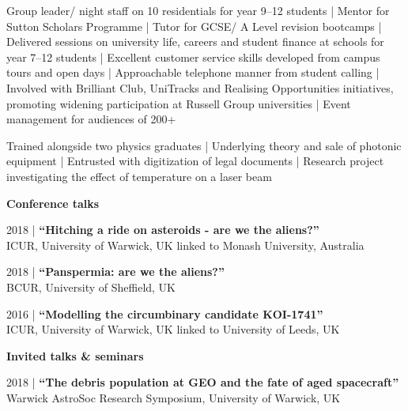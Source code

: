 \documentclass[10pt,a4paper]{altacv}
\begin{document}
\divider

\vspace{-1em}
\small \justify Group leader/ night staff on 10 residentials for year 9--12 students |
Mentor for Sutton Scholars Programme | 
Tutor for GCSE/ A Level revision bootcamps |
Delivered sessions on university life, careers and student finance at schools for year 7--12 students |
Excellent customer service skills developed from campus tours and open days |
Approachable telephone manner from student calling |
Involved with Brilliant Club, UniTracks and Realising Opportunities initiatives, promoting widening participation at Russell Group universities |
Event management for audiences of 200+

\divider

\vspace{-1em}
\small \justify Trained alongside two physics graduates | 
Underlying theory and sale of photonic equipment |
Entrusted with digitization of legal documents |
Research project investigating the effect of temperature on a laser beam

\clearpage


\normalsize \textbf{Conference talks}

\medskip

\small 2018 | \textbf{``Hitching a ride on asteroids - are we the aliens?''} \\
ICUR, University of Warwick, UK linked to Monash University, Australia

\smallskip

\small 2018 | \textbf{``Panspermia: are we the aliens?''} \\
BCUR, University of Sheffield, UK

\smallskip

\small 2016 | \textbf{``Modelling the circumbinary candidate KOI-1741''} \\
ICUR, University of Warwick, UK linked to University of Leeds, UK

\divider

\normalsize \textbf{Invited talks \& seminars}

\medskip

\small 2018 | \textbf{``The debris population at GEO and the fate of aged spacecraft''} \\
Warwick AstroSoc Research Symposium, University of Warwick, UK
\end{document}
